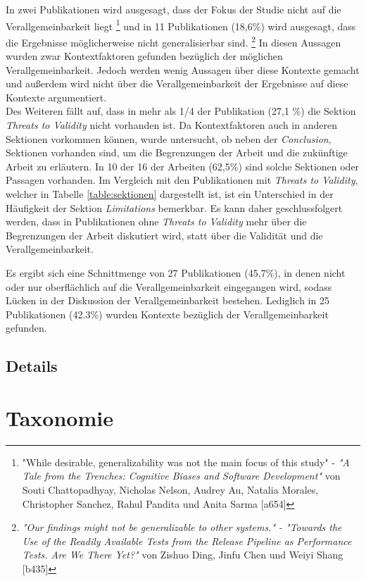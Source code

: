 In zwei Publikationen wird ausgesagt, dass der Fokus der Studie nicht auf die Verallgemeinbarkeit liegt
\footnote{ "While desirable, generalizability was not the main focus of this study" - \textit{"A Tale from the Trenches: Cognitive Biases and Software Development"} von Souti Chattopadhyay, Nicholas Nelson, Audrey Au, Natalia Morales, Christopher Sanchez, Rahul Pandita und Anita Sarma [a654]}
und in 11 Publikationen (18,6\%) wird ausgesagt, dass die Ergebnisse möglicherweise nicht generalisierbar sind.
\footnote{ \textit{"Our findings might not be generalizable to other systems." - "Towards the Use of the Readily Available Tests from the Release
Pipeline as Performance Tests. Are We There Yet?"} von Zishuo Ding, Jinfu Chen und Weiyi Shang [b435] }
In diesen Aussagen wurden zwar Kontextfaktoren gefunden bezüglich der möglichen Verallgemeinbarkeit. Jedoch werden wenig Aussagen über diese Kontexte gemacht und außerdem wird nicht über die Verallgemeinbarkeit der Ergebnisse auf diese Kontexte argumentiert. \\

Des Weiteren fällt auf, dass in mehr als 1/4 der Publikation (27,1 \%) die Sektion \textit{Threats to Validity} nicht vorhanden ist. Da Kontextfaktoren auch in anderen Sektionen vorkommen können, wurde untersucht, ob neben der \textit{Conclusion}, Sektionen vorhanden sind, um die Begrenzungen der Arbeit und die zukünftige Arbeit zu erläutern.
In 10 der 16 der Arbeiten (62,5\%) sind solche Sektionen oder Passagen vorhanden. Im Vergleich mit den Publikationen mit \textit{Threats to Validity}, welcher in Tabelle \ref{table:sektionen} dargestellt ist, ist ein Unterschied in der Häufigkeit der Sektion \textit{Limitations} bemerkbar.
Es kann daher geschlussfolgert werden, dass in Publikationen ohne \textit{Threats to Validity} mehr über die Begrenzungen der Arbeit diskutiert wird, statt über die Validität und die Verallgemeinbarkeit.



Es ergibt sich eine Schnittmenge von 27 Publikationen (45,7\%), in denen nicht oder nur oberflächlich auf die Verallgemeinbarkeit eingegangen wird, sodass Lücken in der Diskussion der Verallgemeinbarkeit bestehen.
Lediglich in 25 Publikationen (42.3\%) wurden Kontexte bezüglich der Verallgemeinbarkeit gefunden.



\clearpage

\subsection{Details}

\section{Taxonomie}

